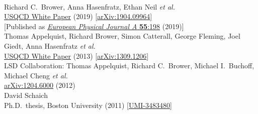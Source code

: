 \begin{spacelist}
\begin{revnumerate}
%
%
%
\vspace{18 pt} \hspace{-22 pt}{\large \bfseries Other articles, theses \& white papers} \vspace{-8 pt}
    \pagebreakitem
       \\
      Richard C.~Brower, Anna Hasenfratz, Ethan Neil \textit{et al.} \\ %
      \href{http://home.fnal.gov/~ask/USQCD/members/WP/BSMwhitepaper2018.pdf}{USQCD White Paper} (2019) [\href{http://arxiv.org/abs/1904.09964}{arXiv:1904.09964}] \\
      {[Published as \href{http://doi.org/10.1140/epja/i2019-12901-5}{\textit{European Physical Journal A} \textbf{55}:198} (2019)]}
    \pagebreakitem
       \\
      Thomas Appelquist, Richard Brower, Simon Catterall, George Fleming, Joel Giedt, Anna Hasenfratz \textit{et al.} \\ %
      \href{http://www.usqcd.org/documents/13BSM.pdf}{USQCD White Paper} (2013) [\href{http://arxiv.org/abs/1309.1206}{arXiv:1309.1206}]
    \pagebreakitem
       \\
      LSD Collaboration: Thomas Appelquist, Richard C.~Brower, Michael I.~Buchoff, Michael Cheng \textit{et al.} \\ %
      \href{http://arxiv.org/abs/1204.6000}{arXiv:1204.6000} (2012)
    \pagebreakitem
       \\
      David Schaich \\
      Ph.D.\ thesis, Boston University (2011) [\href{http://gradworks.umi.com/34/83/3483480.html}{UMI-3483480}]
    \pagebreakitem
       \\

\end{revnumerate}
\end{spacelist}
